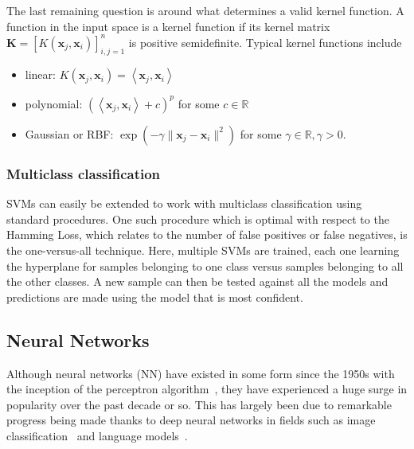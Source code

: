 The last remaining question is around what determines a valid kernel function. A
function in the input space is a kernel function if its kernel matrix
$\mathbf{K} = \left[ K(\mathbf{x}_j,\mathbf{x}_i) \right]^{n}_{i,j=1}$ is
positive semidefinite. Typical kernel functions include
\begin{itemize}

  \item linear: $K(\mathbf{x}_j,\mathbf{x}_i) = \left< \mathbf{x}_j, \mathbf{x}_i \right>$

  \item polynomial: $\left(\left< \mathbf{x}_j, \mathbf{x}_i \right> + c\right)^p$
    for some $c \in \mathbb{R}$

  \item Gaussian or RBF\@: $\exp \left( -\gamma \|\mathbf{x}_j-\mathbf{x}_i\|^2 \right)$
    for some $\gamma \in \mathbb{R}, \gamma > 0$.

\end{itemize}

\subsubsection{Multiclass classification}\label{sssec:multiclass}

SVMs can easily be extended to work with multiclass classification using
standard procedures. One such procedure which is optimal with respect to the
Hamming Loss, which relates to the number of false positives or false negatives,
is the one-versus-all technique. Here, multiple SVMs are trained, each one
learning the hyperplane for samples belonging to one class versus samples
belonging to all the other classes. A new sample can then be tested against all
the models and predictions are made using the model that is most confident.

\subsection{Neural Networks}\label{ssec:nn}

Although neural networks (NN) have existed in some form since the 1950s with the
inception of the perceptron algorithm~\cite{rosenblatt1958perceptron}, they have
experienced a huge surge in popularity over the past decade or so. This has
largely been due to remarkable progress being made thanks to deep neural
networks in fields such as image classification~\cite{krizhevsky2012imagenet}
and language models~\cite{mikolov2010recurrent}.

